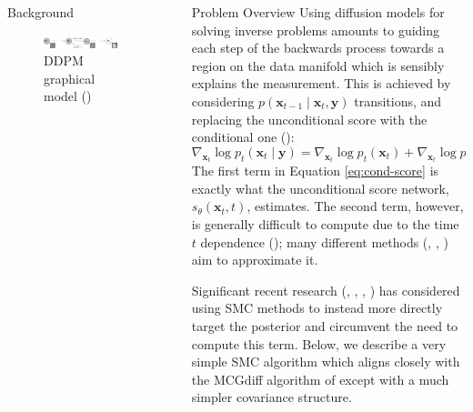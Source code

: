 \documentclass[final]{beamer}
\newlength{\sepwidth}
\newlength{\colwidth}
\newcommand{\separatorcolumn}{\begin{column}{\sepwidth}\end{column}}
\begin{document}
\begin{frame}[t]
\begin{columns}[t]
\begin{column}{\colwidth}
\begin{block}{Background}
        \begin{figure}[htbp]
            \centering
            \includegraphics[width=0.95\colwidth]{poster/assets/ddpm_flow.png}
            \caption{DDPM graphical model (\cite{hoDenoisingDiffusionProbabilistic2020})}
            \label{fig:ddpm_flow}
        \end{figure}
    \end{block}
\end{column}

\separatorcolumn

\begin{column}{\colwidth}

    \begin{block}{Problem Overview}
        Using diffusion models for solving inverse problems amounts to guiding each step of
        the backwards process towards a region on the data manifold which is sensibly explains
        the measurement. This is achieved by considering $p(\mathbf{x}_{t-1} \mid \mathbf{x}_t, \mathbf{y})$
        transitions, and replacing the unconditional score with the conditional one (\cite{chungDiffusionPosteriorSampling2022}):
        \begin{equation}
        \nabla_{\mathbf{x}_t} \log p_t(\mathbf{x}_t \mid \mathbf{y}) = \nabla_{\mathbf{x}_t} \log p_t(\mathbf{x}_t) + \nabla_{\mathbf{x}_t}\log p_t(\mathbf{y} \mid \mathbf{x}_t) \label{eq:cond-score}
        \end{equation}
        The first term in Equation \ref{eq:cond-score} is exactly what the unconditional score network,
        $s_\theta(\mathbf{x}_t, t)$, estimates. The second term, however, is generally difficult
        to compute due to the time $t$ dependence (\cite{chungDiffusionPosteriorSampling2022});
        many different methods (\cite{chungDiffusionPosteriorSampling2022}, \cite{song2023pseudoinverseguided}, \cite{boysTweedieMomentProjected2023}) aim to approximate it.

        Significant recent research (\cite{cardosoMonteCarloGuided2023}, \cite{trippeDiffusionProbabilisticModeling2023}, \cite{wuPracticalAsymptoticallyExact2023}, \cite{janatiDivideandConquerPosteriorSampling2024})
        has considered using SMC methods to instead more directly target the posterior and circumvent
        the need to compute this term. Below, we describe a very simple SMC algorithm which aligns closely
        with the MCGdiff algorithm of \cite{cardosoMonteCarloGuided2023} except with a much simpler
        covariance structure.


\end{block}
\end{column}
\end{columns}
\end{frame}
\end{document}

